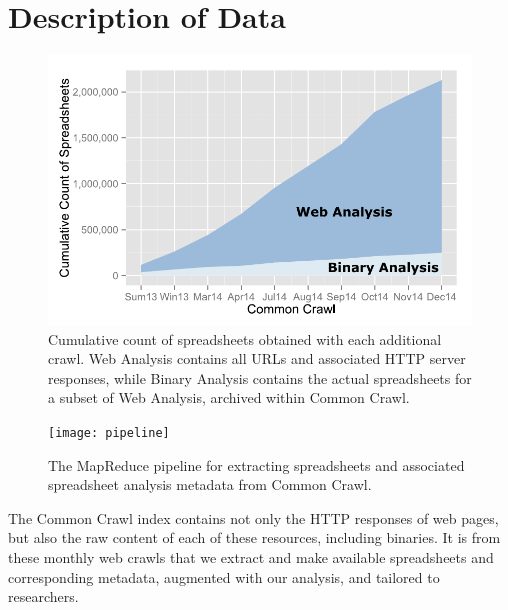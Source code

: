 \documentclass[conference]{IEEEtran}
\begin{document}
\section{Description of Data}

\begin{figure}[!t]
\centering
% 
\includegraphics[width=0.85\columnwidth]{figures/stack}
\caption{Cumulative count of spreadsheets obtained with each additional crawl. Web Analysis contains all URLs and associated HTTP server responses, while Binary Analysis contains the actual spreadsheets for a subset of Web Analysis, archived within Common Crawl.\label{fig:rplot}}
\end{figure}

\begin{figure}[!t]
\centering
\texttt{[image: pipeline]}
\caption{The MapReduce pipeline for extracting spreadsheets and associated spreadsheet analysis metadata from Common Crawl.\label{fig:mrpipeline}}
\end{figure}

The Common Crawl index contains not only the HTTP responses of web pages, but also the raw content of each of these resources, including binaries. It is from these monthly web crawls that we extract and make available spreadsheets and corresponding metadata, augmented with our analysis, and tailored to researchers.

\end{document}
